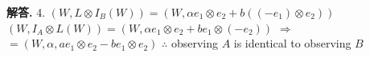 \documentclass[12pt, a4paper, oneside]{article}
\newenvironment{solution}{\par\noindent\textbf{解答. }}{\par}
\begin{document}
\begin{CJK}{UTF8}{gbsn}
\begin{solution}
  4. \newline
  $(W, L\otimes I_B(W)) = (W, \alpha e_1\otimes e_2 + b((-e_1)\otimes e_2))$ \newline
  $(W, I_A\otimes L(W)) = (W, \alpha e_1 \otimes e_2 + be_1\otimes(-e_2))$ \newline
  $\Rightarrow$ $= (W, \alpha, ae_1\otimes e_2-be_1\otimes e_2)$ \newline
  $\therefore$ observing $A$ is identical to observing $B$ 
\end{solution}



\end{CJK}
\end{document}
